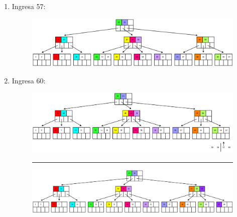 \documentclass{templateNote}
\begin{document}
\begin{itemize}
\begin{enumerate}
\begin{enumerate}
\begin{enumerate}
                \item Ingresa 57:
                \begin{figure}[H]
                    \centering
                    \includegraphics[width=\textwidth]{diagram/P3-1-22.png}
                \end{figure}

                \item Ingresa 60:
                \begin{figure}[H]
                    \centering
                    \includegraphics[width=\textwidth]{diagram/P3-1-23-1.png}
                    \rule{\textwidth}{1pt}
                    \includegraphics[width=\textwidth]{diagram/P3-1-23-2.png}
                \end{figure}
                
            \end{enumerate}
        \end{enumerate}


\end{enumerate}
\end{itemize}
\end{document}
